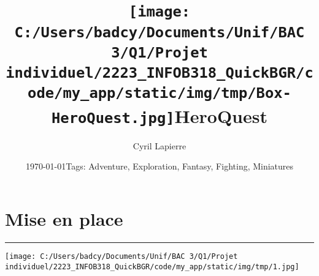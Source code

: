 \documentclass{scrartcl}%
\title{\texttt{[image: C:/Users/badcy/Documents/Unif/BAC 3/Q1/Projet individuel/2223\_INFOB318\_QuickBGR/code/my\_app/static/img/tmp/Box-HeroQuest.jpg]}\break HeroQuest }%
\author{Cyril Lapierre}%
\date{\today \break Tags: Adventure, Exploration, Fantasy, Fighting, Miniatures}%
\begin{document}
%
\normalsize%
\maketitle\thispagestyle{header}%
\pagestyle{header}%
\sectionfont{\color{blue}}%
\subsectionfont{\color{blue}}%
\subsubsectionfont{\color{blue}}%
\section{ Mise en place
}%
\label{sec:Miseenplace}%
\textcolor{blue}{\rule{18cm}{0.07cm}}\break%
%
\begin{center}\texttt{[image: C:/Users/badcy/Documents/Unif/BAC 3/Q1/Projet individuel/2223\_INFOB318\_QuickBGR/code/my\_app/static/img/tmp/1.jpg]}\end{center}%
\end{document}
